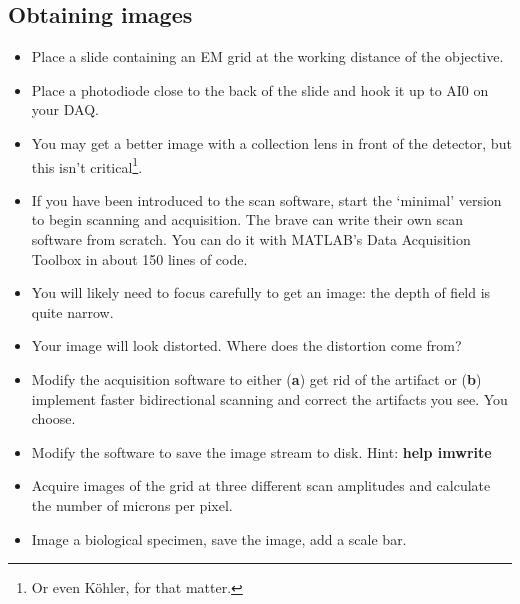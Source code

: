 \documentclass[a4paper]{report}
\begin{document}
\subsection{Obtaining images}
\begin{itemize}
\item Place a slide containing an EM grid at the working distance of the objective. 
\item Place a photodiode close to the back of the slide and hook it up to AI0 on your DAQ. 
\item You may get a better image with a collection lens in front of the detector, but this isn't critical\footnote{Or even K\"{o}hler, for that matter.}.
\item If you have been introduced to the scan software, start the `minimal' version to begin scanning and acquisition.
The brave can write their own scan software from scratch. 
You can do it with MATLAB's Data Acquisition Toolbox in  about 150 lines of code. 
\item You will likely need to focus carefully to get an image: the depth of field is quite narrow. 
\item Your image will look distorted. 
Where does the distortion come from?
\item Modify the acquisition software to either (\textbf{a}) get rid of the artifact or (\textbf{b}) implement faster bidirectional scanning and correct the artifacts you see. You choose. 
\item Modify the software to save the image stream to disk. Hint: \textbf{help imwrite}
\item Acquire images of the grid at three different scan amplitudes and calculate the number of microns per pixel. 
\item Image a biological specimen, save the image, add a scale bar.
\end{itemize}
\end{document}
